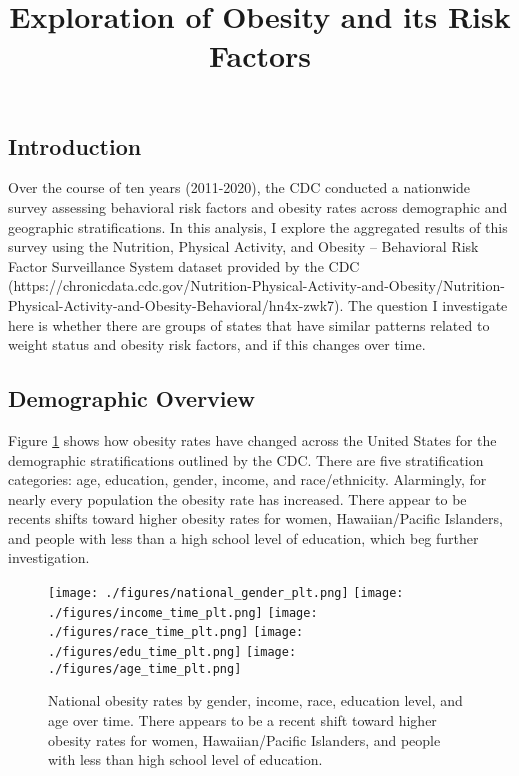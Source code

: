 \documentclass[11pt]{article}
\title{Exploration of Obesity and its Risk Factors}
\begin{document}
\maketitle

\subsection{Introduction}
Over the course of ten years (2011-2020), the CDC conducted a nationwide survey assessing behavioral risk factors and obesity rates across demographic and geographic stratifications. In this analysis, I explore the aggregated results of this survey using the Nutrition, Physical Activity, and Obesity – Behavioral Risk Factor Surveillance System dataset provided by the CDC (https://chronicdata.cdc.gov/Nutrition-Physical-Activity-and-Obesity/Nutrition-Physical-Activity-and-Obesity-Behavioral/hn4x-zwk7). The question I investigate here is whether there are groups of states that have similar patterns related to weight status and obesity risk factors, and if this changes over time. 

\subsection{Demographic Overview}
Figure \ref{fig:dems_by_time} shows how obesity rates have changed across the United States for the demographic stratifications outlined by the CDC. There are five stratification categories: age, education, gender, income, and race/ethnicity. Alarmingly, for nearly every population the obesity rate has increased. There appear to be recents shifts toward higher obesity rates for women, Hawaiian/Pacific Islanders, and people with less than a high school level of education, which beg further investigation.

\begin{figure}[hp]
\texttt{[image: ./figures/national\_gender\_plt.png]}
\texttt{[image: ./figures/income\_time\_plt.png]}
\texttt{[image: ./figures/race\_time\_plt.png]}
\texttt{[image: ./figures/edu\_time\_plt.png]}
\texttt{[image: ./figures/age\_time\_plt.png]}
\caption{\label{fig:dems_by_time}National obesity rates by gender, income, race, education level, and age over time. There appears to be a recent shift toward higher obesity rates for women, Hawaiian/Pacific Islanders, and people with less than high school level of education. 
}
\label{fig:dems_by_time}
\end{figure}
\end{document}
